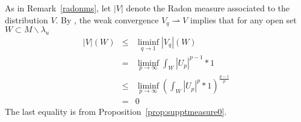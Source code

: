 \documentclass{ip-journal}
\theoremstyle{definition}
\newenvironment{thm:supptmeasure} 
{{\sc Proof of Theorem~\ref{thm:supptmeasure}.}}
{{\sc q.e.d.} \\}
\numberwithin{equation}{section}
\begin{document}
\begin{thm:supptmeasure} 
As in Remark~\ref{radonms}, let $|V| $ denote the Radon measure associated to the distribution $V$.
By \cite[Chapter 6, (2.14)]{simon}, the weak convergence $V_q  \rightharpoonup V$
implies that for any open set $W \subset M \backslash  \lambda_u$
\begin{eqnarray*}
|V|(W) &\leq& \liminf_{q \rightarrow 1} | V_q|(W) \\
&=&\liminf_{p \rightarrow \infty} \int_W |U_{p}|^{p-1}*1\\
&\leq& \liminf_{p \rightarrow \infty} \left( \int_W |U_p|^p*1\right)^{\frac{p-1}{p}}\\
&=& 0
\end{eqnarray*}
The last equality is from Proposition~\ref{prop:supptmeasure0}.
\end{thm:supptmeasure} 
\end{document}
